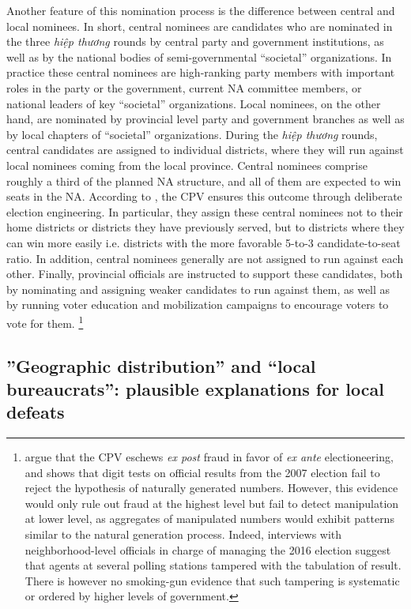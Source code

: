 \documentclass[12pt]{article}\usepackage[]{graphicx}\usepackage[]{color}
\newcommand{\1}{\mathbbm{1}}
\begin{document}
Another feature of this nomination process is the difference between central and local nominees. In short, central nominees are candidates who are nominated in the three \textit{hiệp thương} rounds by central party and government institutions, as well as by the national bodies of semi-governmental ``societal'' organizations. In practice these central nominees are high-ranking party members with important roles in the party or the government, current NA committee members, or national leaders of key ``societal'' organizations. Local nominees, on the other hand, are nominated by provincial level party and government branches as well as by local chapters of ``societal'' organizations. During the \textit{hiệp thương} rounds, central candidates are assigned to individual districts, where they will run against local nominees coming from the local province. Central nominees comprise roughly a third of the planned NA structure, and all of them are expected to win seats in the NA. According to \cite{MaleskySchuler2011}, the CPV ensures this outcome  through deliberate election engineering. In particular, they assign these central nominees not to their home districts or districts they have previously served, but to districts where they can win more easily i.e. districts with the more favorable 5-to-3 candidate-to-seat ratio. In addition,  central nominees generally are not assigned to run against each other. Finally, provincial officials are instructed to support these candidates, both by nominating and assigning  weaker candidates to run against them, as well as by running voter education and mobilization campaigns to encourage voters to vote for them. \footnote{\cite{MaleskySchuler2011} argue that the CPV eschews \textit{ex post} fraud in favor of \textit{ex ante} electioneering, and shows that digit tests on official results from the 2007 election fail to reject the hypothesis of naturally generated numbers. However, this evidence would only rule out fraud at the highest level but fail to detect manipulation at lower level, as aggregates of manipulated numbers would exhibit patterns similar to the natural generation process. Indeed, interviews with neighborhood-level officials in charge of managing the 2016 election suggest that agents at several polling stations tampered with the tabulation of result. There is however no smoking-gun evidence that such tampering is systematic or ordered by higher levels of government.}

\subsection{''Geographic distribution'' and ``local bureaucrats'': plausible explanations for local defeats}
\end{document}
